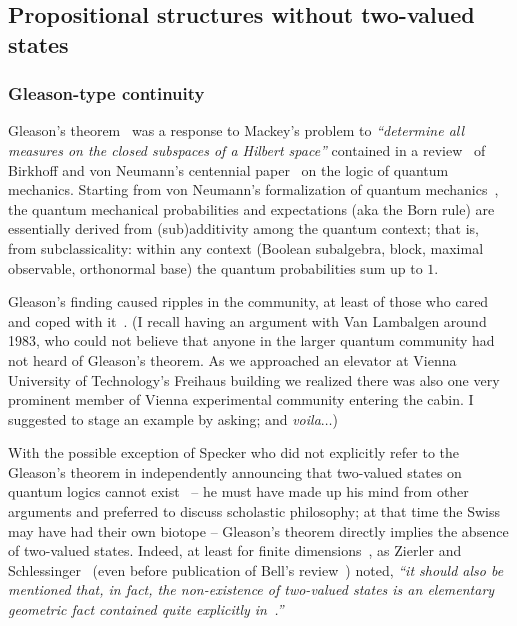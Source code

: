 \documentclass[%
  twocolumn,
 showpacs,
 showkeys,
 preprintnumbers,
 amsmath,amssymb,
 aps,
  pra,
  longbibliography,
 floatfix,
 ]{revtex4-1}
\begin{document}
\subsection{Propositional structures without two-valued states}
\label{2017-b-c-lwtvs}




\subsubsection{Gleason-type continuity}
\label{2017-b-c-lwtvs-gleason}

Gleason's theorem~\cite{Gleason} was a response to Mackey's
problem to {\em ``determine all measures on the closed subspaces of a Hilbert space''} contained in a review~\cite{ma-57} of
Birkhoff and von Neumann's centennial paper~\cite{birkhoff-36} on the logic of quantum mechanics.
Starting from von Neumann's formalization of quantum mechanics~\cite{v-neumann-49,v-neumann-55},
the quantum mechanical probabilities and expectations
(aka the Born rule)
are essentially derived from (sub)additivity
among the quantum context; that is, from subclassicality:
within any context (Boolean subalgebra, block, maximal observable, orthonormal base)
the quantum probabilities sum up to $1$.

Gleason's finding caused ripples in the community,
at least of those who cared and coped with
it~\cite{ZirlSchl-65,kamber65,bell-66,kochen1,c-k-m,r:dvur-93,pitowsky:218,rich-bridge}.
(I recall having an argument with Van Lambalgen around 1983, who could not believe that anyone in the larger quantum community
had not heard of Gleason's theorem.
As we approached an elevator at Vienna University of Technology's Freihaus building we realized there was also one very prominent
member of Vienna experimental community entering the cabin.
I suggested to stage an example by asking; and {\em voila}$\ldots$)

With the possible exception of Specker who did not explicitly refer to the Gleason's theorem
in independently announcing that two-valued states on quantum logics cannot exist~\cite{specker-60}
-- he must have made up his mind from other arguments and preferred to discuss scholastic philosophy;
at that time the Swiss may have had their own biotope --
Gleason's theorem directly implies the absence of two-valued states.
Indeed, at least for finite dimensions~\cite{Alda,Alda2},
as Zierler and Schlessinger~\cite[p.~259, Example~3.2]{ZirlSchl-65} (even before publication of Bell's review~\cite{bell-66}) noted,
 {\em ``it should also be mentioned that, in fact, the non-existence of two-valued states is an elementary
geometric fact contained quite explicitly in~\cite[Paragraph~2.8]{Gleason}.''}
\end{document}
